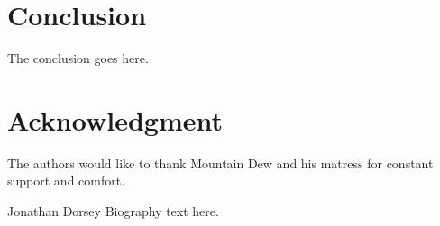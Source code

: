 \documentclass[journal]{IEEEtran}
\begin{document}
\section{Conclusion}
The conclusion goes here.


%
%


\section*{Acknowledgment}


The authors would like to thank Mountain Dew and his matress for constant support and comfort.



\ifCLASSOPTIONcaptionsoff
  \newpage
\fi



%
%
%
%
\cite{craig_introduction_2005}
\cite{khalil_nonlinear_2002}
\cite{rawlings_model_2017}
\cite{armstrong_explicit_1986}
\cite{ogata_modern_2010}
\cite{meriam_engineering_1993}
\cite{greenwood_advanced_2006}
\cite{borrelli_predictive_2017}
\cite{boyd_convex_2004}
\cite{slotine_applied_1991}
\cite{soft_constraints}

\printbibliography

\begin{IEEEbiographynophoto}{Jonathan Dorsey}
Biography text here.
\end{IEEEbiographynophoto}
\end{document}
